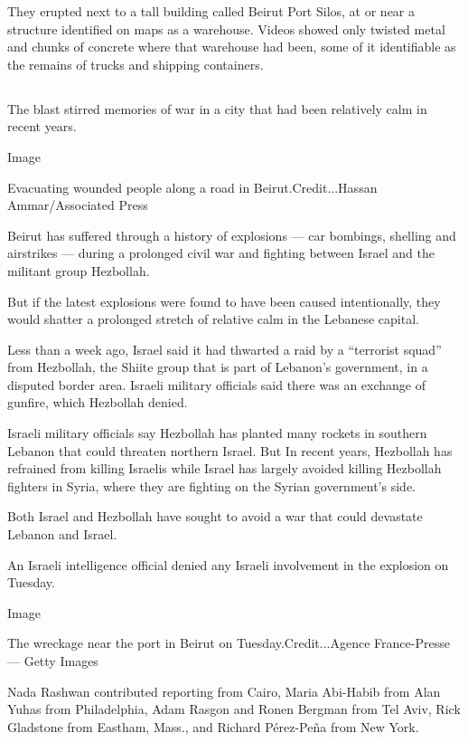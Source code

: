 They erupted next to a tall building called Beirut Port Silos, at or
near a structure identified on maps as a warehouse. Videos showed only
twisted metal and chunks of concrete where that warehouse had been, some
of it identifiable as the remains of trucks and shipping containers.

\hypertarget{-4}{%
\subsection{}\label{-4}}

The blast stirred memories of war in a city that had been relatively
calm in recent years.

Image

Evacuating wounded people along a road in Beirut.Credit...Hassan
Ammar/Associated Press

Beirut has suffered through a history of explosions --- car bombings,
shelling and airstrikes --- during a prolonged civil war and fighting
between Israel and the militant group Hezbollah.

But if the latest explosions were found to have been caused
intentionally, they would shatter a prolonged stretch of relative calm
in the Lebanese capital.

Less than a week ago, Israel said it had thwarted a raid by a
``terrorist squad'' from Hezbollah, the Shiite group that is part of
Lebanon's government, in a disputed border area. Israeli military
officials said there was an exchange of gunfire, which Hezbollah denied.

Israeli military officials say Hezbollah has planted many rockets in
southern Lebanon that could threaten northern Israel. But In recent
years, Hezbollah has refrained from killing Israelis while Israel has
largely avoided killing Hezbollah fighters in Syria, where they are
fighting on the Syrian government's side.

Both Israel and Hezbollah have sought to avoid a war that could
devastate Lebanon and Israel.

An Israeli intelligence official denied any Israeli involvement in the
explosion on Tuesday.

Image

The wreckage near the port in Beirut on Tuesday.Credit...Agence
France-Presse --- Getty Images

Nada Rashwan contributed reporting from Cairo, Maria Abi-Habib from Alan
Yuhas from Philadelphia, Adam Rasgon and Ronen Bergman from Tel Aviv,
Rick Gladstone from Eastham, Mass., and Richard Pérez-Peña from New
York.


